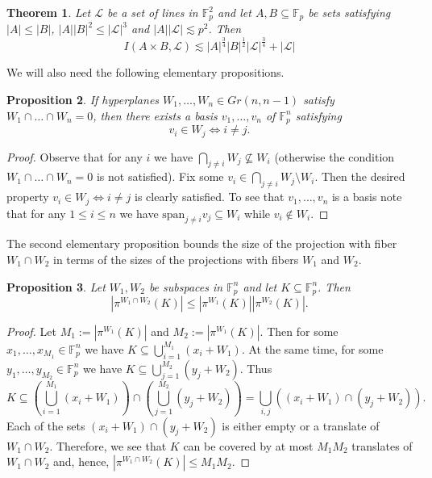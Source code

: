 \documentclass{amsart}
\newtheorem{theorem}{Theorem}[section]
\newtheorem{proposition}[theorem]{Proposition}
\newcommand{\F}{\mathbb F}
\begin{document}
\begin{theorem}\label{IncidenceBoundsTheorem}
    Let $\mathcal{L}$ be a set of lines in $\F_p^2$ and let $A, B \subseteq \mathbb{F}_p$ be sets satisfying $|A| \leq |B|$, $|A||B|^2 \leq |\mathcal{L}|^3$ and $|A||\mathcal{L}| \lesssim p^2$. Then $$I(A \times B, \mathcal{L}) \lesssim |A|^\frac{3}{4}|B|^\frac{1}{2}|\mathcal{L}|^\frac{3}{4} + |\mathcal{L}|$$
\end{theorem}

We will also need the following elementary propositions.

\begin{proposition}\label{niceBasis}
    If hyperplanes $W_1, \ldots, W_n \in Gr(n, n - 1)$ satisfy $W_1 \cap \ldots \cap W_n = 0$, then there exists a basis $v_1, \ldots, v_n$ of $\F_p^n$ satisfying 
    $$v_i \in W_j \Leftrightarrow i \neq j.$$
\end{proposition}

\begin{proof}
    Observe that for any $i$ we have $\bigcap_{j \neq i} W_j \not \subseteq W_i$ (otherwise the condition $W_1 \cap \ldots \cap W_n = 0$ is not satisfied). Fix some $v_i \in \bigcap_{j \neq i} W_j \setminus W_i$. Then the desired property $v_i \in W_j \Leftrightarrow i \neq j$ is clearly satisfied. To see that $v_1, \ldots, v_n$ is a basis note that for any $1 \leq i \leq n$ we have $\text{span}_{j \neq i} v_j \subseteq W_i$ while $v_i \not \in W_i$.
\end{proof}

The second elementary proposition bounds the size of the projection with fiber $W_1 \cap W_2$ in terms of the sizes of the projections with fibers $W_1$ and $W_2$.

\begin{proposition}\label{intersectionBound}
    Let $W_1, W_2$ be subspaces in $\F_p^n$ and let $K \subseteq \F_p^n$. Then $$|\pi^{W_1 \cap W_2}(K)| \leq |\pi^{W_1}(K)| |\pi^{W_2}(K)|.$$
\end{proposition}

\begin{proof}
    Let $M_1 := |\pi^{W_1}(K)|$ and $M_2 := |\pi^{W_1}(K)|$. Then for some $x_1, \ldots, x_{M_1} \in \F_p^n$ we have $K \subseteq \bigcup_{i = 1}^{M_1} (x_i + W_1)$. At the same time, for some $y_1, \ldots, y_{M_2} \in \F_p^n$ we have $K \subseteq \bigcup_{j = 1}^{M_2} (y_j + W_2)$. Thus $$K \subseteq (\bigcup_{i = 1}^{M_1} (x_i + W_1)) \cap (\bigcup_{j = 1}^{M_2} (y_j + W_2)) = \bigcup_{i, j} ((x_i + W_1) \cap (y_j + W_2)).$$
    Each of the sets $(x_i + W_1) \cap (y_j + W_2)$ is either empty or a translate of $W_1 \cap W_2$. Therefore, we see that $K$ can be covered by at most $M_1M_2$ translates of $W_1 \cap W_2$ and, hence, $|\pi^{W_1 \cap W_2}(K)| \leq M_1M_2$.
\end{proof}
\end{document}
